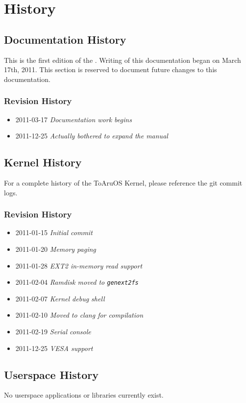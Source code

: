 \section{History}

\subsection{Documentation History}
This is the first edition of the \toarutitle. Writing of this documentation began on March 17th, 2011. This section is reserved to document future changes to this documentation.

\subsubsection{Revision History}
\begin{itemize}
    \item 2011-03-17 \emph{Documentation work begins}
    \item 2011-12-25 \emph{Actually bothered to expand the manual}
\end{itemize}

\subsection{Kernel History}
For a complete history of the ToAruOS Kernel, please reference the git commit logs.

\subsubsection{Revision History}
\begin{itemize}
    \item 2011-01-15 \emph{Initial commit}
    \item 2011-01-20 \emph{Memory paging}
    \item 2011-01-28 \emph{EXT2 in-memory read support}
    \item 2011-02-04 \emph{Ramdisk moved to \texttt{genext2fs}}
    \item 2011-02-07 \emph{Kernel debug shell}
    \item 2011-02-10 \emph{Moved to clang for compilation}
    \item 2011-02-19 \emph{Serial console}
    \item 2011-12-25 \emph{VESA support}
\end{itemize}

\subsection{Userspace History}
No userspace applications or libraries currently exist.
